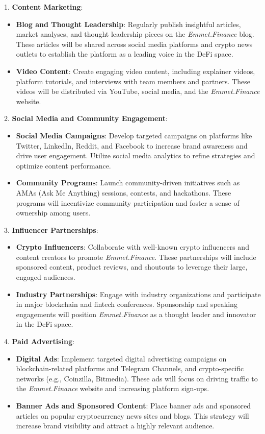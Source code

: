 \documentclass[12pt, a4paper]{article}
\begin{document}
1. \textbf{Content Marketing}:
   \begin{itemize}
       \item \textbf{Blog and Thought Leadership}: Regularly publish insightful articles, market analyses, and thought leadership pieces on the \textit{Emmet.Finance} blog. These articles will be shared across social media platforms and crypto news outlets to establish the platform as a leading voice in the DeFi space.
       \item \textbf{Video Content}: Create engaging video content, including explainer videos, platform tutorials, and interviews with team members and partners. These videos will be distributed via YouTube, social media, and the \textit{Emmet.Finance} website.
   \end{itemize}

2. \textbf{Social Media and Community Engagement}:
   \begin{itemize}
       \item \textbf{Social Media Campaigns}: Develop targeted campaigns on platforms like Twitter, LinkedIn, Reddit, and Facebook to increase brand awareness and drive user engagement. Utilize social media analytics to refine strategies and optimize content performance.
       \item \textbf{Community Programs}: Launch community-driven initiatives such as AMAs (Ask Me Anything) sessions, contests, and hackathons. These programs will incentivize community participation and foster a sense of ownership among users.
   \end{itemize}

3. \textbf{Influencer Partnerships}:
   \begin{itemize}
       \item \textbf{Crypto Influencers}: Collaborate with well-known crypto influencers and content creators to promote \textit{Emmet.Finance}. These partnerships will include sponsored content, product reviews, and shoutouts to leverage their large, engaged audiences.
       \item \textbf{Industry Partnerships}: Engage with industry organizations and participate in major blockchain and fintech conferences. Sponsorship and speaking engagements will position \textit{Emmet.Finance} as a thought leader and innovator in the DeFi space.
   \end{itemize}

4. \textbf{Paid Advertising}:
   \begin{itemize}
       \item \textbf{Digital Ads}: Implement targeted digital advertising campaigns on blockchain-related platforms and Telegram Channels, and crypto-specific networks (e.g., Coinzilla, Bitmedia). These ads will focus on driving traffic to the \textit{Emmet.Finance} website and increasing platform sign-ups.
       \item \textbf{Banner Ads and Sponsored Content}: Place banner ads and sponsored articles on popular cryptocurrency news sites and blogs. This strategy will increase brand visibility and attract a highly relevant audience.
   \end{itemize}
\end{document}
